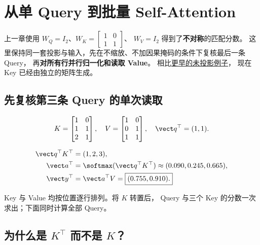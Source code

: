 \chapterrule
\section{从单 Query 到批量 Self-Attention}
\label{intro:11-softmax-memory}

\label{intro:12-self-attention-matrices}
\label{concept:self-attention}


上一章使用 $W_Q=I_2$、$W_K=\begin{bmatrix}1&0\\1&1\end{bmatrix}$、
$W_V=I_2$ 得到了\textbf{不对称}的匹配分数。
这里保持同一套投影与输入，先在不缩放、不加因果掩码的条件下复核最后一条 Query，
再\textbf{对所有行并行归一化和读取 Value}。
相比\hyperref[intro:21c-naive-attention]{更早的未投影例子}，
现在 Key 已经由独立的矩阵生成。

\subsection{先复核第三条 Query 的单次读取}
\[
K=\begin{bmatrix}1&0\\1&1\\2&1\end{bmatrix},\quad
V=\begin{bmatrix}1&0\\0&1\\1&1\end{bmatrix},\quad
\vect q^\top=(1,1).
\]
\begin{example}
\[
\begin{aligned}
\vect q^\top K^\top&=(1,2,3),\\
\vect a^\top&=\softmax(\vect q^\top K^\top)
\approx(0.090,0.245,0.665),\\
\vect y^\top&=\vect a^\top V=\boxed{(0.755,0.910).}
\end{aligned}
\]
\end{example}
Key 与 Value 均按位置逐行排列。将 $K$ 转置后，
Query 与三个 Key 的分数一次求出；下面同时计算全部 Query。

\subsection{\texorpdfstring{为什么是 $K^\top$ 而不是 $K$？}{为什么是 K 转置而不是 K？}}
\label{sec:key-layout-card}


